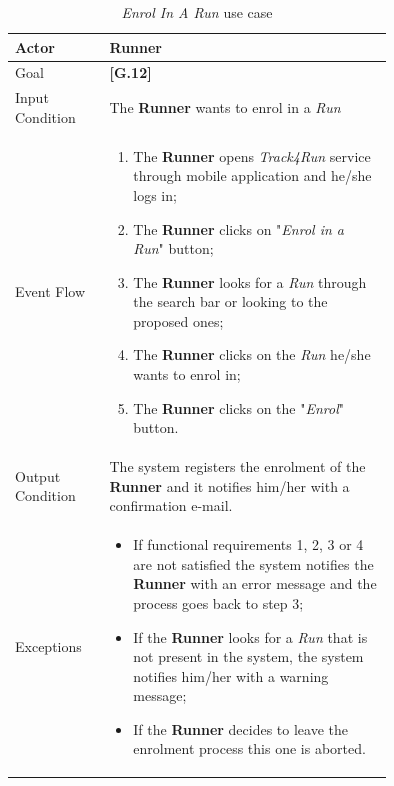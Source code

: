 \begin{center}
\begin{table}[H]
\begin{tabular}{ | l | p{0.75\linewidth} | }
  \hline
    Actor & \textbf{Runner} \\ \hline
    Goal & \textbf{[G.12]} \\ \hline
    Input Condition & The \textbf{Runner} wants to enrol in a \textit{Run} \\ \hline
    Event Flow & \begin{minipage}[t]{0.7\textwidth}
      \begin{enumerate}
        \item The \textbf{Runner} opens \textit{Track4Run} service through mobile application and he/she logs in;
        \item The \textbf{Runner} clicks on "\textit{Enrol in a Run}" button;
        \item The \textbf{Runner} looks for a \textit{Run} through the search bar or looking to the proposed ones;
        \item The \textbf{Runner} clicks on the \textit{Run} he/she wants to enrol in;
        \item The \textbf{Runner} clicks on the "\textit{Enrol}" button.
      \end{enumerate}
    \smallskip
  \end{minipage} \\ \hline
  Output Condition & The system registers the enrolment of the \textbf{Runner} and it notifies him/her with a confirmation e-mail. \\ \hline
  Exceptions & \begin{minipage}[t]{0.7\textwidth}
    \begin{itemize}
      \smallskip
      \item If functional requirements 1, 2, 3 or 4 are not satisfied the system notifies the \textbf{Runner} with an error message and the process goes back to step 3;
      \item If the \textbf{Runner} looks for a \textit{Run} that is not present in the system, the system notifies him/her with a warning message;
      \item If the \textbf{Runner} decides to leave the enrolment process this one is aborted.
    \end{itemize}
    \smallskip
  \end{minipage}  \\ \hline
\end{tabular}
\caption{\textit{Enrol In A Run} use case}
\label{table:enrolRunTable}
\end{table}
\end{center}

